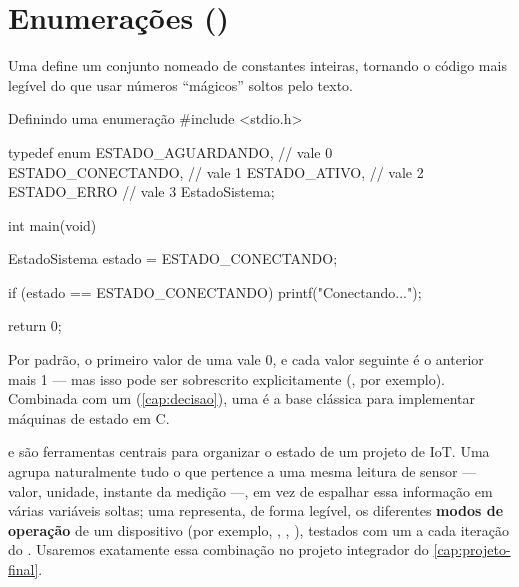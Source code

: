 \section{Enumerações ()}

Uma  define um conjunto nomeado de constantes inteiras, tornando o código mais legível do que usar números ``mágicos'' soltos pelo texto.

\begin{codigoc}{Definindo uma enumeração}
#include <stdio.h>

typedef enum {
    ESTADO_AGUARDANDO,   // vale 0
    ESTADO_CONECTANDO,   // vale 1
    ESTADO_ATIVO,        // vale 2
    ESTADO_ERRO          // vale 3
} EstadoSistema;

int main(void) {
    EstadoSistema estado = ESTADO_CONECTANDO;

    if (estado == ESTADO_CONECTANDO) {
        printf("Conectando...\n");
    }

    return 0;
}
\end{codigoc}

Por padrão, o primeiro valor de uma  vale 0, e cada valor seguinte é o anterior mais 1 — mas isso pode ser sobrescrito explicitamente (, por exemplo). Combinada com um  (\cref{cap:decisao}), uma  é a base clássica para implementar máquinas de estado em C.

\begin{esp32box}
 e  são ferramentas centrais para organizar o estado de um projeto de IoT. Uma  agrupa naturalmente tudo o que pertence a uma mesma leitura de sensor — valor, unidade, instante da medição —, em vez de espalhar essa informação em várias variáveis soltas; uma  representa, de forma legível, os diferentes \textbf{modos de operação} de um dispositivo (por exemplo, , , ), testados com um  a cada iteração do . Usaremos exatamente essa combinação no projeto integrador do \cref{cap:projeto-final}.
\end{esp32box}
